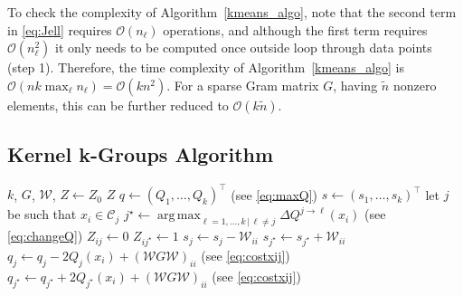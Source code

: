 \documentclass[10pt,journal,compsoc]{IEEEtran}
\DeclareMathOperator*{\argmax}{arg\,max}
\newcommand\C{{\mathcal{C}}}
\newcommand\OO{{\mathcal{O}}}
\newcommand\W{{\mathcal{W}}}
\begin{document}
To check the complexity of Algorithm~\ref{kmeans_algo}, 
note that the second term %
in \eqref{eq:Jell} requires
$\OO(n_\ell)$ operations, and although the first term requires
$\OO(n_\ell^2)$ it only needs to be computed once outside loop through
data points (step 1).
Therefore, the time complexity of Algorithm~\ref{kmeans_algo}
is $\OO(n k \max_\ell n_\ell) = \OO(k n^2)$. For a sparse
Gram matrix $G$, having
$\tilde{n}$ nonzero elements, this can be further reduced
to $\OO(k \tilde{n})$. 


\subsection{Kernel k-Groups Algorithm}

\begin{algorithm}[t]
\begin{algorithmic}[1]
    \INPUT $k$, $G$, $\W$, $Z \leftarrow Z_0$
    \OUTPUT $Z$
  \STATE $q \leftarrow (Q_1, \dotsc, Q_k)^\top$ 
            \hfill (see \eqref{eq:maxQ})
  \STATE $s \leftarrow (s_1,\dotsc,s_k)^\top$ 
  \REPEAT
        \STATE let $j$ be such that $x_i \in \C_j$
        \STATE $j^\star \leftarrow \argmax_{\ell=1,\dotsc,k \, | \, \ell\ne j} 
                \Delta Q^{j\to \ell}(x_i)$
            \hfill (see \eqref{eq:changeQ}) \label{stepmove}
            \STATE $Z_{ij} \leftarrow 0$
            \STATE $Z_{ij^\star} \leftarrow 1$
            \STATE $s_j \leftarrow s_j - \mathcal{W}_{ii}$ 
            \STATE $s_{j^\star} \leftarrow s_{j^\star} + \mathcal{W}_{ii}$
            \STATE $q_j \leftarrow q_j - 2Q_j(x_i) + (\W G \W)_{ii}$
                \hfill (see \eqref{eq:costxij})
            \STATE 
            $q_{j^\star} \leftarrow q_{j^\star} + 2Q_{j^\star}(x_i)+ 
                (\W G\W)_{ii}$
                \hfill (see \eqref{eq:costxij})
        \ENDIF
    \ENDFOR
\end{algorithmic}
\caption{\label{algo}
Kernel k-groups algorithm, based on Hartigan's method, to find
local solutions to problem \eqref{eq:qcqp3}.
}
\end{algorithm}
\end{document}
